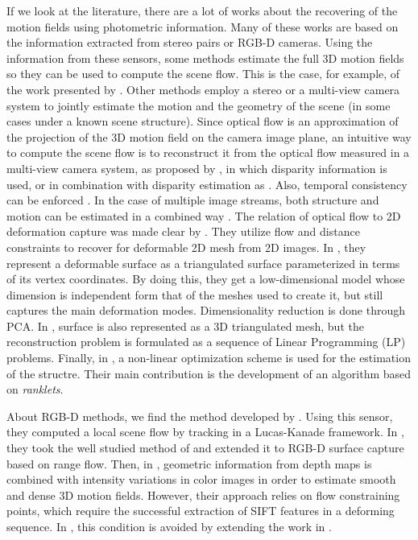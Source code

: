 If we look at the literature, there are a lot of works about the recovering of the motion fields using photometric information. Many of these works are based on the information extracted from stereo  pairs or RGB-D cameras. Using the information from these sensors, some methods estimate the full 3D motion fields so they can be used to compute the scene flow. This is the case, for example, of the work presented by \cite{vedula1999three}. Other methods employ a stereo or a multi-view camera system to jointly estimate the motion and the geometry of the scene (in some cases under a known scene structure). Since optical flow is an approximation of the projection of the 3D motion field on the camera image plane, an intuitive way to compute the scene flow is to reconstruct it from the optical flow measured in a multi-view camera system, as proposed by \cite{vedula2005three}, in which disparity information is used, or in combination with disparity estimation as \cite{huguet2007variational, li2008multi, zhang20013d}. Also, temporal consistency can be enforced \citep{rabe2010dense}. In the case of multiple image streams, both structure and motion can be estimated in a combined way \citep{pons2007multi, basha2013multi}. The relation of optical flow to 2D deformation capture was made clear by \cite{hilsmann2007deformable}. They utilize flow and distance constraints to recover for deformable 2D mesh from 2D images. In \cite{salzmann2007surface}, they represent a deformable surface as a triangulated surface parameterized in terms of its vertex coordinates. By doing this, they get a low-dimensional model whose dimension is independent form that of the meshes used to create it, but still captures the main deformation modes. Dimensionality reduction is done through \ac{PCA}. In \cite{wang2010monocular}, surface is also represented as a 3D triangulated mesh, but the reconstruction problem is formulated as a sequence of Linear Programming (LP) problems. Finally, in \cite{delbue2007nonrigid}, a non-linear optimization scheme is used for the estimation of the structre. Their main contribution is the development of an algorithm based on \emph{ranklets}.

About RGB-D methods, we find the method developed by \cite{quiroga2014local}. Using this sensor, they computed a local scene flow by tracking in a Lucas-Kanade framework. In \cite{spies2000dense}, they took the well studied method of \cite{horn1981determining} and extended it to RGB-D surface capture based on range flow. Then, in \cite{petit2011surface, letouzey2011scene}, geometric information from depth maps is combined with intensity variations in color images in order to estimate smooth and dense 3D motion fields. However, their approach relies on flow constraining points, which require the successful extraction of SIFT features in a deforming sequence. In \cite{birdal2012monocular}, this condition is avoided by extending the work in \cite{spies2000dense}. 

